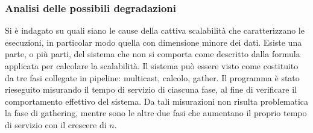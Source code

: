 \subsubsection*{Analisi delle possibili degradazioni}
Si \`e indagato su quali siano le cause della cattiva scalabilit\`a che caratterizzano le esecuzioni, in particolar modo quella con dimensione minore dei dati. Esiste una parte, o pi\`u parti, del sistema che non si comporta come descritto dalla formula applicata per calcolare la scalabilit\`a. 
  Il sistema pu\`o essere visto come costituito da tre fasi collegate in pipeline: multicast, calcolo, gather. Il programma \`e stato rieseguito misurando il tempo di servizio di ciascuna fase, al fine di verificare il comportamento effettivo del sistema. Da tali misurazioni non risulta problematica la fase di gathering, mentre sono le altre due fasi che aumentano il proprio tempo di servizio con il crescere di $n$. 
